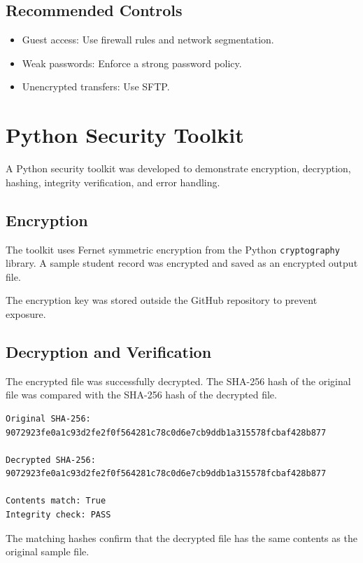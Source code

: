 \documentclass[12pt]{article}
\begin{document}
\subsection{Recommended Controls}

\begin{itemize}
\item Guest access: Use firewall rules and network segmentation.
\item Weak passwords: Enforce a strong password policy.
\item Unencrypted transfers: Use SFTP.
\end{itemize}

\section{Python Security Toolkit}

A Python security toolkit was developed to demonstrate encryption, decryption, hashing, integrity verification, and error handling.

\subsection{Encryption}

The toolkit uses Fernet symmetric encryption from the Python \texttt{cryptography} library. A sample student record was encrypted and saved as an encrypted output file.

The encryption key was stored outside the GitHub repository to prevent exposure.

\subsection{Decryption and Verification}

The encrypted file was successfully decrypted. The SHA-256 hash of the original file was compared with the SHA-256 hash of the decrypted file.

\begin{verbatim}
Original SHA-256:
9072923fe0a1c93d2fe2f0f564281c78c0d6e7cb9ddb1a315578fcbaf428b877

Decrypted SHA-256:
9072923fe0a1c93d2fe2f0f564281c78c0d6e7cb9ddb1a315578fcbaf428b877

Contents match: True
Integrity check: PASS
\end{verbatim}

The matching hashes confirm that the decrypted file has the same contents as the original sample file.
\end{document}
